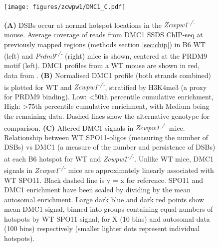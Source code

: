 \begin{figure}[H]
	\centering
	\texttt{[image: figures/zcwpw1/DMC1\_C.pdf]}
	\caption[DMC1 SSDS ChIPseq]{
		\textbf{(A)} DSBs occur at normal hotspot locations in the \textit{Zcwpw1\textsuperscript{-/-}} mouse.
			Average coverage of reads from DMC1 SSDS ChIP-seq at previously mapped regions (methods section \ref{sec:chip}) in B6 WT (left) and \textit{Prdm9\textsuperscript{-/-}} (right) mice is shown, centered at the PRDM9 motif (left).
			DMC1 profiles from a WT mouse are shown in red, data from \parencite{Brick2012Genetic}.
		\textbf{(B)} Normalised DMC1 profile (both strands combined) is plotted for WT and \textit{Zcwpw1\textsuperscript{-/-}}, stratified by H3K4me3 (a proxy for PRDM9 binding).
			Low: <50th percentile cumulative enrichment, High: >75th percentile cumulative enrichment, with Medium being the remaining data.
			Dashed lines show the alternative genotype for comparison.
		\textbf{(C)} Altered DMC1 signals in \textit{Zcwpw1\textsuperscript{-/-}} mice.
			Relationship between WT SPO11-oligos (measuring the number of DSBs) vs DMC1 (a measure of the number and persistence of DSBs) at each B6 hotspot for WT and \textit{Zcwpw1\textsuperscript{-/-}}.
			Unlike WT mice, DMC1 signals in \textit{Zcwpw1\textsuperscript{-/-}} mice are approximately linearly associated with WT SPO11.
			Black dashed line is y = x for reference.
			SPO11 and DMC1 enrichment have been scaled by dividing by the mean autosomal enrichment.
			Large dark blue and dark red points show mean DMC1 signal, binned into groups containing equal numbers of hotspots by WT SPO11 signal, for X (10 bins) and autosomal data (100 bins) respectively (smaller lighter dots represent individual hotspots).
	}
	\label{fig:DMC1_SSDS}
\end{figure} 

